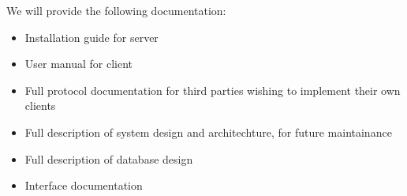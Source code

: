 We will provide the following documentation:
\begin{itemize}
\item Installation guide for server
\item User manual for client
\item Full protocol documentation for third parties wishing to implement their
      own clients
\item Full description of system design and architechture, for future
      maintainance
\item Full description of database design
\item Interface documentation 
\end{itemize}
